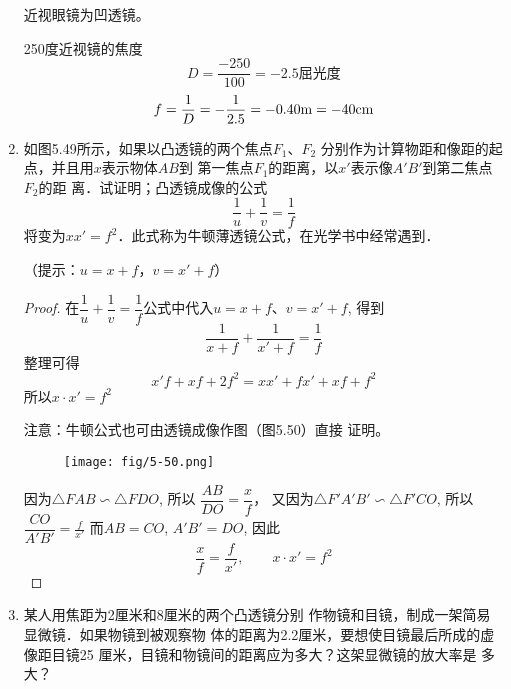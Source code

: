 \begin{enumerate}
\begin{solution}
    近视眼镜为凹透镜。
    
    250度近视镜的焦度
\[D=\frac{-250}{100}=-2.5\text{屈光度}\]
\[f=\frac{1}{D}=-\frac{1}{2.5}=-0.40{\rm m}=-40{\rm cm}\]
\end{solution}
\item 如图5.49所示，如果以凸透镜的两个焦点$F_1$、$F_2$
分别作为计算物距和像距的起点，并且用$x$表示物体$AB$到
第一焦点$F_1$的距离，以$x'$表示像$A'B'$到第二焦点$F_2$的距
离．试证明；凸透镜成像的公式
\[\frac{1}{u}+\frac{1}{v}=\frac{1}{f} \]
将变为$xx'=f^2$．此式称为牛顿薄透镜公式，在光学书中经常遇到．
\begin{figure}[htp]
	\centering
{}
	\caption{}
\end{figure}
（提示：$u=x+f$，$v=x'+f$）

\begin{proof}
在$\dfrac{1}{u}+\dfrac{1}{v}=\dfrac{1}{f}$公式中代入$u=x+f$、$v=x'+f$, 
得到
\[\frac{1}{x+f}+\frac{1}{x'+f}=\frac{1}{f}\]    
整理可得
\[x'f+xf+2f^2=xx'+fx'+xf+f^2\]
所以$x\cdot x'=f^2$

注意：牛顿公式也可由透镜成像作图（图5.50）直接
证明。
\begin{figure}[htp]
    \centering
    \texttt{[image: fig/5-50.png]}
    \caption{}
\end{figure}

因为$\triangle FAB\backsim \triangle FDO$, 所以
$\dfrac{AB}{DO}=\dfrac{x}{f}$，
又因为$\triangle F'A'B'\backsim \triangle F'CO$, 所以$\dfrac{CO}{A'B'}=\frac{f}{x'}$
而$AB=CO$, $A'B'=DO$, 因此
\[\frac{x}{f}=\frac{f}{x'},\qquad x\cdot x'=f^2\]
\end{proof}
\item 某人用焦距为2厘米和8厘米的两个凸透镜分别
作物镜和目镜，制成一架简易显微镜．如果物镜到被观察物
体的距离为2.2厘米，要想使目镜最后所成的虚像距目镜25
厘米，目镜和物镜间的距离应为多大？这架显微镜的放大率是
多大？


\end{enumerate}
